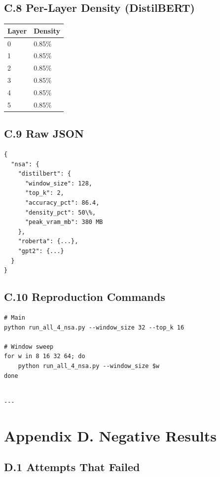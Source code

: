 \subsection{C.8 Per-Layer Density (DistilBERT)}

\begin{table}[H]
\centering
\small
\begin{tabular}{ll}
\toprule
\textbf{Layer} & \textbf{Density} \\
\midrule
0 & 0.85\% \\
1 & 0.85\% \\
2 & 0.85\% \\
3 & 0.85\% \\
4 & 0.85\% \\
5 & 0.85\% \\
\bottomrule
\end{tabular}
\end{table}

\subsection{C.9 Raw JSON}

\begin{lstlisting}
{
  "nsa": {
    "distilbert": {
      "window_size": 128,
      "top_k": 2,
      "accuracy_pct": 86.4,
      "density_pct": 50\%,
      "peak_vram_mb": 380 MB
    },
    "roberta": {...},
    "gpt2": {...}
  }
}
\end{lstlisting}

\subsection{C.10 Reproduction Commands}

\begin{lstlisting}
# Main
python run_all_4_nsa.py --window_size 32 --top_k 16

# Window sweep
for w in 8 16 32 64; do
    python run_all_4_nsa.py --window_size $w
done
\end{lstlisting}
\begin{lstlisting}

---
\end{lstlisting}


\section{Appendix D. Negative Results}

\subsection{D.1 Attempts That Failed}

